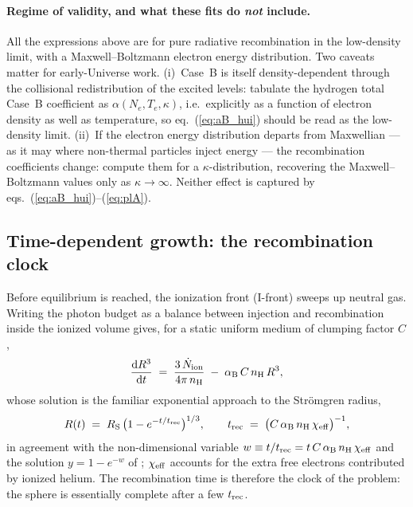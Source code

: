 \documentclass[11pt,a4paper]{article}
\newcommand{\Ndot}{\dot{N}_{\rm ion}}
\newcommand{\aB}{\alpha_{\rm B}}
\newcommand{\nH}{n_{\rm H}}
\begin{document}
\paragraph{Regime of validity, and what these fits do \emph{not} include.}
All the expressions above are for pure radiative recombination in the low-density limit, with a
Maxwell--Boltzmann electron energy distribution. Two caveats matter for early-Universe work.
(i)~Case~B is itself density-dependent through the collisional redistribution of the excited levels:
\citet{Storey2014} tabulate the hydrogen total Case~B coefficient as $\alpha(N_e,T_e,\kappa)$, i.e.\
explicitly as a function of electron density as well as temperature, so eq.~(\ref{eq:aB_hui}) should
be read as the low-density limit.
(ii)~If the electron energy distribution departs from Maxwellian --- as it may where non-thermal
particles inject energy --- the recombination coefficients change: \citet{Storey2014} compute them
for a $\kappa$-distribution, recovering the Maxwell--Boltzmann values only as $\kappa\to\infty$.
Neither effect is captured by eqs.~(\ref{eq:aB_hui})--(\ref{eq:plA}).

\subsection{Time-dependent growth: the recombination clock}
Before equilibrium is reached, the ionization front (I-front) sweeps up neutral gas. Writing the
photon budget as a balance between injection and recombination inside the ionized volume gives, for a
static uniform medium of clumping factor $C$,
\begin{equation}
  \frac{{\rm d}R^3}{{\rm d}t} \;=\; \frac{3\,\Ndot}{4\pi\,\nH} \;-\; \aB\,C\,\nH\,R^3,
  \label{eq:ode_static}
\end{equation}
whose solution is the familiar exponential approach to the Str\"omgren radius,
\begin{equation}
  R(t) \;=\; R_{\rm S}\,\bigl(1-e^{-t/t_{\rm rec}}\bigr)^{1/3},
  \qquad
  t_{\rm rec} \;=\; \bigl(C\,\aB\,\nH\,\chi_{\rm eff}\bigr)^{-1},
  \label{eq:Rt}
\end{equation}
in agreement with the non-dimensional variable $w\equiv t/t_{\rm rec}=t\,C\,\aB\,\nH\,\chi_{\rm eff}$
and the solution $y=1-e^{-w}$ of \citet{Shapiro2006}; $\chi_{\rm eff}$ accounts for the extra free
electrons contributed by ionized helium. The recombination time is therefore the clock of the
problem: the sphere is essentially complete after a few $t_{\rm rec}$.
\end{document}
